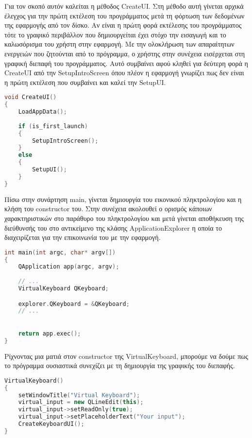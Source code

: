 Για τον σκοπό αυτόν καλείται η μέθοδος CreateUI. Στη μέθοδο αυτή γίνεται αρχικά έλεγχος για την
πρώτη εκτέλεση του προγράμματος μετά τη φόρτωση των δεδομένων της εφαρμογής από τον δίσκο. Αν
είναι η πρώτη φορά εκτέλεσης του προγράμματος τότε το γραφικό περιβάλλον που δημιουργείται έχει
στόχο την εισαγωγή και το καλωσόρισμα του χρήστη στην εφαρμογή. Με την ολοκλήρωση των απαραίτητων
ενεργειών που ζητούνται από το πρόγραμμα, ο χρήστης στην συνέχεια εισέρχεται στη γραφική διεπαφή
του προγράμματος. Αυτό συμβαίνει αφού κληθεί για δεύτερη φορά η CreateUI από την SetupIntroScreen
όπου πλέον η εφαρμογή γνωρίζει πως δεν είναι η πρώτη εκτέλεση που συμβαίνει και καλεί την SetupUI.

\begin{lstlisting}[language=C++, style=cppstyle]
void CreateUI() 
{
    LoadAppData();
    
    if (is_first_launch)
    {
        SetupIntroScreen();
    }
    else
    {
        SetupUI();
    }
}
\end{lstlisting}

Πίσω στην συνάρτηση main, γίνεται δημιουργία του εικονικού πληκτρολογίου και η κλήση του constructor
του. Στην συνέχεια ακολουθεί ο ορισμός κάποιων χαρακτηριστικών στο παράθυρο του πληκτρολογίου και 
μετά γίνεται αποθήκευση της διεύθυνσής του στο αντικείμενο της κλάσης ApplicationExplorer η οποία
το διαχειρίζεται για την επικοινωνία του με την εφαρμογή.

\begin{lstlisting}[language=C++, style=cppstyle]
int main(int argc, char* argv[]) 
{
    QApplication app(argc, argv);
    
    // ...
    VirtualKeyboard QKeyboard;

    explorer.QKeyboard = &QKeyboard;
    // ...

    
    return app.exec();
}
\end{lstlisting}

Ρίχνοντας μια ματιά στον constructor της VirtualKeyboard, μπορούμε να δούμε πως το πρόγραμμα ουσιαστικά
συνεχίζει με τη δημιουργία της γραφικής του διεπαφής.

\begin{lstlisting}[language=C++, style=cppstyle]
VirtualKeyboard()
{
    setWindowTitle("Virtual Keyboard");
    virtual_input = new QLineEdit(this);
    virtual_input->setReadOnly(true);
    virtual_input->setPlaceholderText("Your input");
    CreateKeyboardUI();
}
\end{lstlisting}

